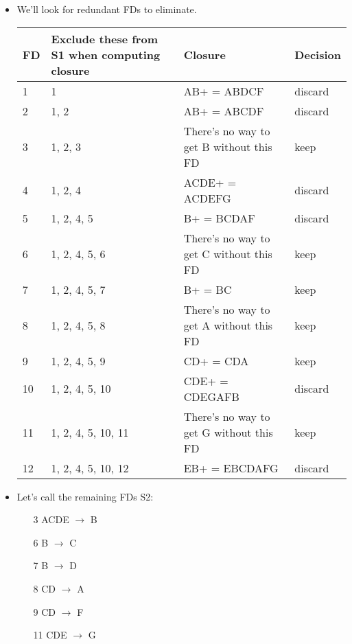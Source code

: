 \documentclass{article}
\begin{document}
\begin{enumerate}
\begin{enumerate}
\begin{itemize}
\item %
We'll look for redundant FDs to eliminate.
\begin{table}[h!]
\centering
\begin{tabular}{ p{0.5cm} | p{4cm} | p{8cm} | p{2cm} } 
 FD & Exclude these from S1 when computing closure & Closure & Decision \\ [0.5ex] 
 \hline
 1 & 1 & AB+ = ABDCF & discard \\ 
 \hline
 2 & 1, 2 & AB+ = ABCDF & discard \\
 \hline
 3 & 1, 2, 3 & There's no way to get B without this FD & keep \\
 \hline
 4 & 1, 2, 4 & ACDE+ = ACDEFG & discard \\
 \hline
 5 & 1, 2, 4, 5 & B+ = BCDAF & discard \\
  \hline
 6 & 1, 2, 4, 5, 6 & There's no way to get C without this FD & keep \\
  \hline
 7 & 1, 2, 4, 5, 7 & B+ = BC & keep \\
  \hline
 8 & 1, 2, 4, 5, 8 & There's no way to get A without this FD & keep \\
  \hline
 9 & 1, 2, 4, 5, 9 & CD+ = CDA & keep \\
  \hline
 10 & 1, 2, 4, 5, 10 & CDE+ = CDEGAFB & discard \\
  \hline
 11 & 1, 2, 4, 5, 10, 11 & There's no way to get G without this FD & keep \\
  \hline
 12 & 1, 2, 4, 5, 10, 12 & EB+ = EBCDAFG & discard \\
\end{tabular}
\end{table}

\item %
Let's call the remaining FDs S2:
\begin{enumerate} 
\item[3] ACDE $\rightarrow$ B
\item[6] B $\rightarrow$ C
\item[7] B $\rightarrow$ D
\item[8] CD $\rightarrow$ A
\item[9] CD $\rightarrow$ F
\item[11] CDE $\rightarrow$ G
\end{enumerate}


\end{itemize}
\end{enumerate}
\end{enumerate}
\end{document}
